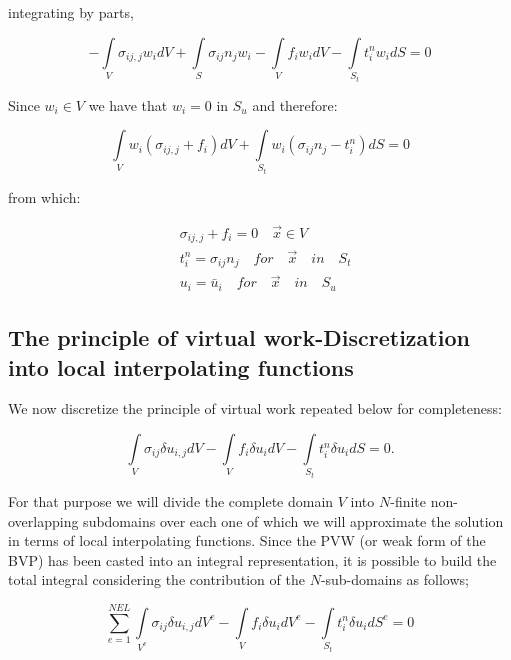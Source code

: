 integrating by parts,

\[ - \int\limits_V {{\sigma _{ij,j}}{w_i}dV + \int\limits_S {{\sigma _{ij}}{n_j}{w_i}}  - \int\limits_V {{f_i}{w_i}dV - \int\limits_{{S_t}} {t_i^n} } } {w_i}dS = 0\]

Since ${w_i} \in V$ we have that ${w_i}=0$ in $S_u$ and therefore:

\[\int\limits_V {{w_i}\left( {{\sigma _{ij,j}} + {f_i}} \right)dV + \int\limits_{{S_t}} {{w_i}\left( {{\sigma _{ij}}{n_j} - t_i^n} \right)dS = 0} } \]

from which:

\begin{equation} \label{equil_2}
\begin{split}
&{\sigma _{ij,j}} + {f_i} = 0 \quad \vec{x} \in V \\
&t_i^n = {\sigma _{ij}}{n_j} \quad for \quad \vec{x} \quad in \quad S_t\\
&{u_i} = {{\bar u}_i} \quad for \quad \vec{x} \quad in \quad S_u
\end{split}
\end{equation}

\subsection{The principle of virtual work-Discretization into local interpolating functions}
We now discretize the principle of virtual work repeated below for completeness:

\begin{equation} \label{pvw_2}
\int\limits_V {{\sigma _{ij}}\delta {u_{i,j}}dV - \int\limits_V {{f_i}\delta {u_i}dV - \int\limits_{{S_t}} {t_i^n} } } \delta {u_i}dS = 0.
\end{equation}

For that purpose we will divide the complete domain $V$ into $N$-finite non-overlapping subdomains over each one of which we will approximate the solution in terms of local interpolating functions. Since the PVW (or weak form of the BVP) has been casted into an integral representation, it is possible to build the total integral considering the contribution of the $N$-sub-domains as follows;

\begin{equation}\label{pvw_dis}
\sum\limits_{e = 1}^{NEL} {\int\limits_{{V^e}} {{\sigma _{ij}}\delta {u_{i,j}}d{V^e} - \int\limits_V {{f_i}\delta {u_i}d{V^e} - \int\limits_{{S_t}} {t_i^n} } } \delta {u_i}d{S^e} = 0} 
\end{equation}

